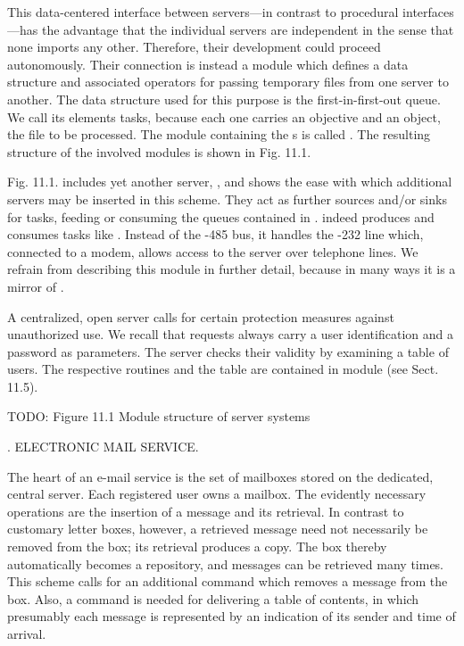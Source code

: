This data-centered interface between servers---in contrast to procedural inter\-faces---has the advantage that the individual servers are independent in the sense that none imports any other. Therefore, their development could proceed autonomously. Their connection is instead a module which defines a data structure and associated operators for passing temporary files from one server to another. The data structure used for this purpose is the first-in-first-out queue. We call its elements tasks, because each one carries an objective and an object, the file to be processed. The module containing the s is called . The resulting structure of the involved modules is shown in Fig. 11.1.

Fig. 11.1. includes yet another server, , and shows the ease with which additional servers may be inserted in this scheme. They act as further sources and/or sinks for tasks, feeding or consuming the queues contained in .  indeed produces and consumes tasks like . Instead of the -485 bus, it handles the -232 line which, connected to a modem, allows access to the server over telephone lines. We refrain from describing this module in further detail, because in many ways it is a mirror of .

A centralized, open server calls for certain protection measures against unauthorized use. We recall that requests always carry a user identification and a password as parameters. The server checks their validity by examining a table of users. The respective routines and the table are contained in module  (see Sect. 11.5).

TODO: Figure 11.1 Module structure of server systems

. ELECTRONIC MAIL SERVICE.

The heart of an e-mail service is the set of mailboxes stored on the dedicated, central server. Each registered user owns a mailbox. The evidently necessary operations are the insertion of a message and its retrieval. In contrast to customary letter boxes, however, a retrieved message need not necessarily be removed from the box; its retrieval produces a copy. The box thereby automatically becomes a repository, and messages can be retrieved many times. This scheme calls for an additional command which removes a message from the box. Also, a command is needed for delivering a table of contents, in which presumably each message is represented by an indication of its sender and time of arrival.

